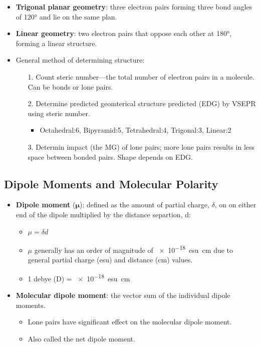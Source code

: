 \documentclass[12pt,a4paper]{article}
\begin{document}
\begin{itemize}
    \item \textbf{Trigonal planar geometry}: three electron pairs forming three bond angles of \ang{120} and lie on the same plan. 
    \item \textbf{Linear geometry}: two electron pairs that oppose each other at \ang{180}, forming a linear structure.
    \item General method of determining structure:
    \begin{itemize}
        \item[1.] Count steric number---the total number of electron pairs in a molecule. Can be bonds or lone pairs.
        \item[2.] Determine predicted geomterical structure predicted (EDG) by VSEPR using steric number.
            \begin{itemize}
                \item Octahedral:6, Bipyramid:5, Tetrahedral:4, Trigonal:3, Linear:2
            \end{itemize}
        \item[3.] Determin impact (the MG) of lone pairs; more lone pairs results in less space between bonded pairs. Shape depends on EDG.
    \end{itemize} 
\end{itemize}

\subsection{Dipole Moments and Molecular Polarity}
\begin{itemize}
    \item \textbf{Dipole moment} ($\bm{\mu}$): defined as the amount of partial charge, $\delta$, on on either end of the dipole multiplied by the distance separtion, d:
        \begin{itemize}
            \item {\color{o-Sun}\(\mu=\delta d\)}
            \item $\mu$ generally has an order of magnitude of {\color{o-Sun}\SI{e-18}{esu.cm}} due to general partial charge (esu) and distance (cm) values.
            \item 1 {\color{o-Sun}debye (D)} = \SI{e-18}{esu.cm} 
        \end{itemize}
    \item \textbf{Molecular dipole moment}: the vector sum of the individual dipole moments.
        \begin{itemize}
            \item Lone pairs have significant effect on the molecular dipole moment.
            \item Also called the net dipole moment.
        \end{itemize}
\end{itemize}
\end{document}
